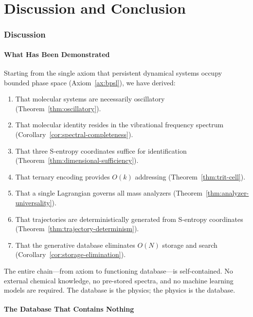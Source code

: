 \documentclass[11pt,twocolumn,a4paper]{article}
\theoremstyle{definition}
\theoremstyle{remark}
\begin{document}
\part{Discussion and Conclusion}
\label{part:discussion}

\section{Discussion}
\label{sec:discussion}

\subsection{What Has Been Demonstrated}
\label{sec:demonstrated}

Starting from the single axiom that persistent dynamical systems occupy bounded phase space (Axiom~\ref{ax:bpsl}), we have derived:
\begin{enumerate}
  \item That molecular systems are necessarily oscillatory (Theorem~\ref{thm:oscillatory}).
  \item That molecular identity resides in the vibrational frequency spectrum (Corollary~\ref{cor:spectral-completeness}).
  \item That three S-entropy coordinates suffice for identification (Theorem~\ref{thm:dimensional-sufficiency}).
  \item That ternary encoding provides $O(k)$ addressing (Theorem~\ref{thm:trit-cell}).
  \item That a single Lagrangian governs all mass analyzers (Theorem~\ref{thm:analyzer-universality}).
  \item That trajectories are deterministically generated from S-entropy coordinates (Theorem~\ref{thm:trajectory-determinism}).
  \item That the generative database eliminates $O(N)$ storage and search (Corollary~\ref{cor:storage-elimination}).
\end{enumerate}

The entire chain---from axiom to functioning database---is self-contained. No external chemical knowledge, no pre-stored spectra, and no machine learning models are required. The database is the physics; the physics is the database.

\subsection{The Database That Contains Nothing}
\label{sec:contains-nothing}
\end{document}
